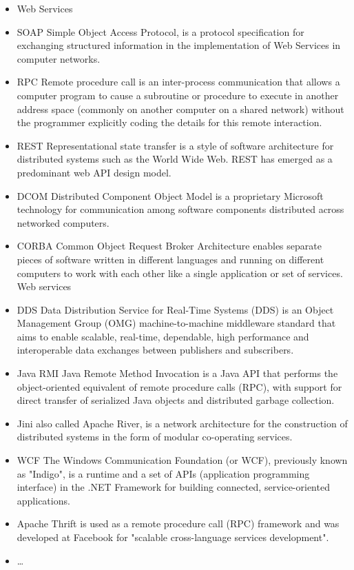 \begin{itemize}
  \item Web Services
  \item{SOAP} Simple Object Access Protocol, is a protocol specification for exchanging structured information in the implementation of Web Services in computer networks.
  \item{RPC} Remote procedure call is an inter-process communication that allows
  a computer program to cause a subroutine or procedure to execute in another address space (commonly on another computer on a shared network) without the programmer explicitly coding the details for this remote interaction. 
  \item{REST} Representational state transfer is a style of software architecture for distributed systems such as the World Wide Web. REST has emerged as a predominant web API design model.
  \item{DCOM} Distributed Component Object Model is a proprietary Microsoft technology for communication among software components distributed across networked computers. 
  \item{CORBA}  Common Object Request Broker Architecture enables separate pieces of software written in different
    languages and running on different computers to work with each other like a single application or set of services. Web services
  \item{DDS} Data Distribution Service for Real-Time Systems (DDS) is an Object
  Management Group (OMG) machine-to-machine middleware standard that aims to
  enable scalable, real-time, dependable, high performance and interoperable data exchanges between publishers and subscribers. 
  \item{Java RMI} Java Remote Method Invocation is a Java API that performs the
  object-oriented equivalent of remote procedure calls (RPC), with support for direct transfer of serialized Java objects and distributed garbage collection.
  \item{Jini}  also called Apache River, is a network architecture for the construction of distributed systems in the form of modular co-operating services.
  \item{WCF} The Windows Communication Foundation (or WCF), previously known as
  "Indigo", is a runtime and a set of APIs (application programming interface)
  in the .NET Framework for building connected, service-oriented applications.
  \item{Apache Thrift} is used as a remote procedure call (RPC) framework and
  was developed at Facebook for "scalable cross-language services development".
  \item \ldots
\end{itemize}

